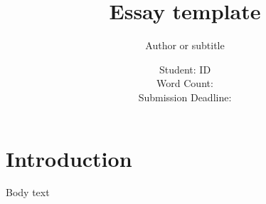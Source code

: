 \documentclass[12pt,a4paper]{article}
\title{Essay template}
\author{Author or subtitle}
\date{Student: ID \\ Word Count:  \\ Submission Deadline: }
\begin{document}
\maketitle


\section*{Introduction}

Body text

\pagebreak



\end{document}
